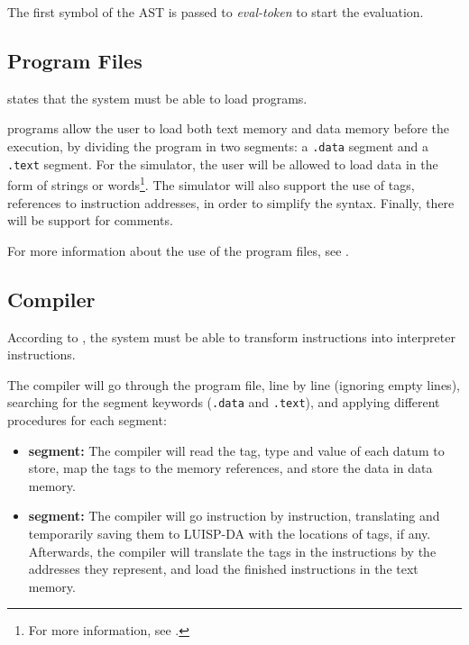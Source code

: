 \noindent
The first symbol of the \gls{AST} is passed to \textit{eval-token} to start the evaluation.


\subsection{Program Files}
 states that the system must be able to load  programs.

 programs allow the user to load both \gls{text memory} and \gls{data memory} before the execution, by dividing the program in two segments: a \texttt{.data} segment and a \texttt{.text} segment. For the simulator, the user will be allowed to load data in the form of strings or \glspl{word}\footnote{For more information, see .}. The simulator will also support the use of tags, references to instruction addresses, in order to simplify the  syntax. Finally, there will be support for comments.

\noindent
For more information about the use of the program files, see .


\subsection{Compiler}\label{subsec:compiler-design}
According to , the system must be able to transform  instructions into interpreter instructions.

The compiler will go through the program file, line by line (ignoring empty lines), searching for the segment keywords (\texttt{.data} and \texttt{.text}), and applying different procedures for each segment:
\begin{itemize}
  \item \textbf{ segment:} The compiler will read the tag, type and value of each datum to store, map the tags to the memory references, and store the data in \gls{data memory}.
  \item \textbf{ segment:} The compiler will go instruction by instruction, translating and temporarily saving them to LUISP-DA with the locations of tags, if any. Afterwards, the compiler will translate the tags in the instructions by the addresses they represent, and load the finished instructions in the \gls{text memory}.
\end{itemize}



